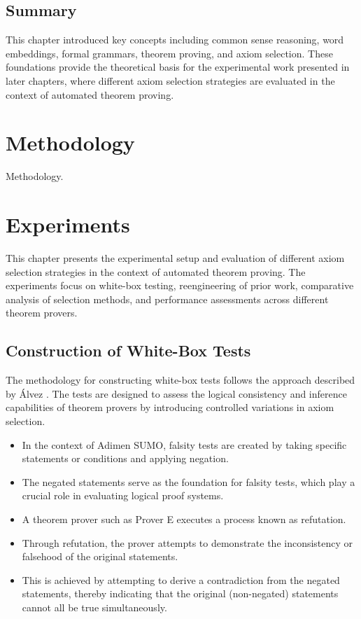 \documentclass[english,version-2020-11]{uzl-thesis}
\begin{document}
\section{Summary}
This chapter introduced key concepts including common sense reasoning, word embeddings, formal grammars, theorem proving, and axiom selection. These foundations provide the theoretical basis for the experimental work presented in later chapters, where different axiom selection strategies are evaluated in the context of automated theorem proving.

\clearpage

\chapter{Methodology}
\label{chapter-methodology}
Methodology.

\clearpage

\chapter{Experiments}
\label{chapter-experiments}

This chapter presents the experimental setup and evaluation of different axiom selection strategies in the context of automated theorem proving. The experiments focus on white-box testing, reengineering of prior work, comparative analysis of selection methods, and performance assessments across different theorem provers.

\section{Construction of White-Box Tests}

The methodology for constructing white-box tests follows the approach described by Álvez \cite{Álvez2017}. The tests are designed to assess the logical consistency and inference capabilities of theorem provers by introducing controlled variations in axiom selection.

\begin{itemize}
    \item In the context of Adimen SUMO, falsity tests are created by taking specific statements or conditions and applying negation.
    \item The negated statements serve as the foundation for falsity tests, which play a crucial role in evaluating logical proof systems.
    \item A theorem prover such as Prover E executes a process known as refutation.
    \item Through refutation, the prover attempts to demonstrate the inconsistency or falsehood of the original statements.
    \item This is achieved by attempting to derive a contradiction from the negated statements, thereby indicating that the original (non-negated) statements cannot all be true simultaneously.
\end{itemize}
\end{document}
